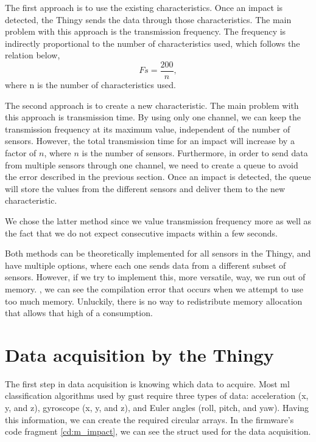 The first approach is to use the existing characteristics. Once an impact is detected, the Thingy sends the data through those characteristics. The main problem with this approach is the transmission frequency. The frequency is indirectly proportional to the number of characteristics used, which follows the relation below,
\begin{equation*}
	Fs =  \frac{200}{n},
\end{equation*}
where n is the number of characteristics used.

The second approach is to create a new characteristic. The main problem with this approach is transmission time. By using only one channel, we can keep the transmission frequency at its maximum value, independent of the number of sensors. However, the total transmission time for an impact will increase by a factor of $n$, where $n$ is the number of sensors. Furthermore, in order to send data from multiple sensors through one channel, we need to create a queue to avoid the error described in the previous section. Once an impact is detected, the queue will store the values from the different sensors and deliver them to the new characteristic.

We chose the latter method since we value transmission frequency more as well as the fact that we do not expect consecutive impacts within a few seconds.

Both methods can be theoretically implemented for all sensors in the Thingy, and have multiple options, where each one sends data from a different subset of sensors. However, if we try to implement this, more versatile, way, we run out of memory. , we can see the compilation error that occurs when we attempt to use too much memory. Unluckily, there is no way to redistribute memory allocation that allows that high of a consumption.

\section{Data acquisition by the Thingy}

The first step in data acquisition is knowing which data to acquire. Most \gls{ml} classification algorithms used by \gls{gust} require three types of data: acceleration (x, y, and z), gyroscope (x, y, and z), and Euler angles (roll, pitch, and yaw). Having this information, we can create the required circular arrays.  In the firmware's code fragment \ref{cd:m_impact}, we can see the struct used for the data acquisition.

